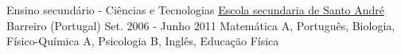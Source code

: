 

\begin{cventries}

  \cventry
    {Ensino secundário - Ciências e Tecnologias} %
    {\href{http://www.aesa.edu.pt/edu/}{Escola secundaria de Santo André}} %
    {Barreiro (Portugal)} %
    {Set. 2006 - Junho 2011} %
    {Matemática A, Português, Biologia, Físico-Química A, Psicologia B, Inglês, Educação Física}
    \vspace{0.5cm}

\end{cventries}
